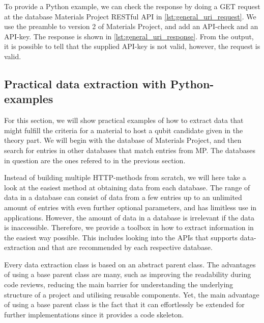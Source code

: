 To provide a Python example, we can check the response by doing a GET request at the database Materials Project RESTful API in \autoref{lst:general_uri_request}. We use the preamble to version 2 of Materials Project, and add an API-check and an API-key. The response is shown in \autoref{lst:general_uri_response}. From the output, it is possible to tell that the supplied API-key is not valid, however, the request is valid.


\subsection{Practical data extraction with Python-examples}

For this section, we will show practical examples of how to extract data that might fulfill the criteria for a material to host a qubit candidate given in the theory part. We will begin with the database of Materials Project, and then search for entries in other databases that match entries from MP. The databases in question are the ones refered to in the previous section.

Instead of building multiple HTTP-methods from scratch, we will here take a look at the easiest method at obtaining data from each database. The range of data in a database can consist of data from a few entries up to an unlimited amount of entries with even further optional parameters, and has limitless use in applications. However, the amount of data in a database is irrelevant if the data is inaccessible. Therefore, we provide a toolbox in how to extract information in the easiest way possible. This includes looking into the APIs that supports data-extraction and that are recommended by each respective database.



Every data extraction class is based on an abstract parent class. The advantages of using a base parent class are many, such as improving the readability during code reviews, reducing the main barrier for understanding the underlying structure of a project and utilising reusable components. Yet, the main advantage of using a base parent class is the fact that it can effortlessly be extended for further implementations since it provides a code skeleton.


